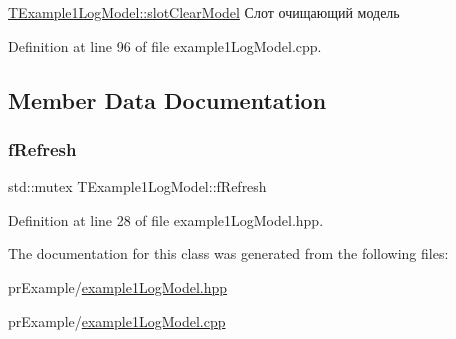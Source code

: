 \hyperlink{class_t_example1_log_model_ad94610473fbd8834e350061f60e92f95}{T\+Example1\+Log\+Model\+::slot\+Clear\+Model} Слот очищающий модель 



Definition at line 96 of file example1\+Log\+Model.\+cpp.



\subsection{Member Data Documentation}
\mbox{\label{class_t_example1_log_model_af19d00cf74d3dc54e2ba8ddd015d4dc6}} 
\subsubsection{\texorpdfstring{f\+Refresh}{fRefresh}}
{\footnotesize\ttfamily std\+::mutex T\+Example1\+Log\+Model\+::f\+Refresh\hspace{0.3cm}{\ttfamily [private]}}



Definition at line 28 of file example1\+Log\+Model.\+hpp.



The documentation for this class was generated from the following files\+:\begin{DoxyCompactItemize}
\item 
pr\+Example/\hyperlink{example1_log_model_8hpp}{example1\+Log\+Model.\+hpp}\item 
pr\+Example/\hyperlink{example1_log_model_8cpp}{example1\+Log\+Model.\+cpp}\end{DoxyCompactItemize}
